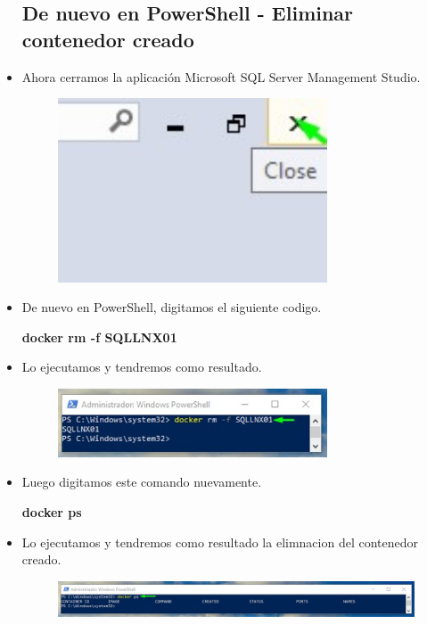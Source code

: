 \begin{itemize}
			\subsection{De nuevo en PowerShell - Eliminar contenedor creado}
				\item Ahora cerramos la aplicación Microsoft SQL Server Management Studio.
					\begin{figure}[htb]
						\begin{center}
							\includegraphics[width=8cm]{./Imagenes/CerrarSql}
						\end{center}
					\end{figure}
				\item De nuevo en PowerShell, digitamos el siguiente codigo.
					\begin{center}
						\textbf{docker rm -f SQLLNX01} \\
					\end{center}
				\item Lo ejecutamos y tendremos como resultado.
					\begin{figure}[htb]
						\begin{center}
							\includegraphics[width=8cm]{./Imagenes/Comando07}
						\end{center}
					\end{figure}
				\item Luego digitamos este comando nuevamente.
					\begin{center}
						\textbf{docker ps} \\
					\end{center}
				\item Lo ejecutamos y tendremos como resultado la elimnacion del contenedor creado.
					\begin{figure}[htb]
						\begin{center}
							\includegraphics[width=19cm]{./Imagenes/Comando08}
						\end{center}
					\end{figure}
					\vspace{5cm}

\end{itemize}
